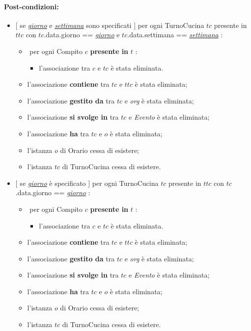{\paragraph{Post-condizioni:} 
\begin{itemize}
   \item $[$ se \underline{\textit{giorno}} e \underline{\textit{settimana}} sono specificati $]$ \textlangle per ogni TurnoCucina $tc$ presente in $ttc$ con $tc$.data.giorno == \underline{\textit{giorno}} e $tc$.data.settimana == \underline{\textit{settimana}} \textrangle:
\begin{itemize}
   \item \textlangle $ $ per ogni Compito $c$ \textbf{presente in} $t$ \textrangle:
    \begin{itemize}
        \item l'associazione tra $c$ e $tc$ è stata eliminata.
        \end{itemize}
    \item l'associazione \textbf{contiene} tra $tc$ e $ttc$ è stata eliminata;
    \item l'associazione \textbf{gestito da} tra $tc$ e \textit{org} è stata eliminata;
\item l'associazione \textbf{si svolge in} tra $tc$ e \textit{Evento} è stata eliminata;
  \item l'associazione \textbf{ha} tra $tc$ e $o$ è stata eliminata;
    \item l'istanza $o$ di Orario cessa di esistere;
    \item l'istanza $tc$ di TurnoCucina cessa di esistere.
\end{itemize}
   \item $[$ se \underline{\textit{giorno}} è specificato $]$ \textlangle per ogni TurnoCucina $tc$ presente in $ttc$ con $tc$.data.giorno == \underline{\textit{giorno}} \textrangle:
\begin{itemize}
   \item \textlangle $ $ per ogni Compito $c$ \textbf{presente in} $t$ \textrangle:
    \begin{itemize}
        \item l'associazione tra $c$ e $tc$ è stata eliminata.
    \end{itemize}
    \item l'associazione \textbf{contiene} tra $tc$ e $ttc$ è stata eliminata;
    \item l'associazione \textbf{gestito da} tra $tc$ e \textit{org} è stata eliminata;
\item l'associazione \textbf{si svolge in} tra $tc$ e \textit{Evento} è stata eliminata;
    \item l'associazione \textbf{ha} tra $tc$ e $o$ è stata eliminata;
    \item l'istanza $o$ di Orario cessa di esistere;
    \item l'istanza $tc$ di TurnoCucina cessa di esistere.
\end{itemize}


\end{itemize}}

